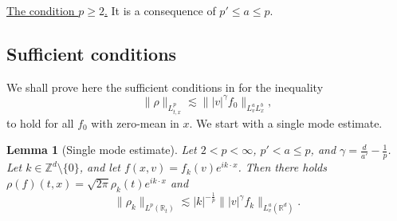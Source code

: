 \documentclass[11pt,a4paper,reqno]{amsart}
\theoremstyle{plain}
\newtheorem{lemma}[theorem]{Lemma}
\theoremstyle{remark}
\begin{document}
\medskip

\noindent \underline{The condition $p \geq 2$.} It is a consequence of $p' \leq a \leq p$.

\subsection{Sufficient conditions} We shall prove here the sufficient conditions in  for the inequality
\begin{equation}\label{gamma-p-a-b-ineq-suff}
    \|\rho\|_{L^p_{t,x}} \lesssim \||v|^{\gamma}f_0\|_{L^a_vL^b_x},
\end{equation}
to hold for all $f_0$ with zero-mean in $x$.
We start with a single mode estimate.

\begin{lemma}[Single mode estimate]\label{lem.mono-mode}
Let $2<p<\infty$, $p'<a\leq p$, and $\gamma=\frac{d}{a'}-\frac{1}{p}$. 
Let $k\in\mathbb Z^d\setminus\{0\}$, and let $f(x,v)=f_k(v)e^{ik\cdot x}$. Then there holds $\rho(f)(t,x)=\sqrt{2\pi}\rho_k(t)e^{ik\cdot x}$ and
\[
    \|\rho_k\|_{L^p(\mathbb R_t)} \lesssim |k|^{-\frac{1}{p}} \||v|^\gamma f_k\|_{L^a_v(\mathbb R^d)}.
\]
\end{lemma}
\end{document}
